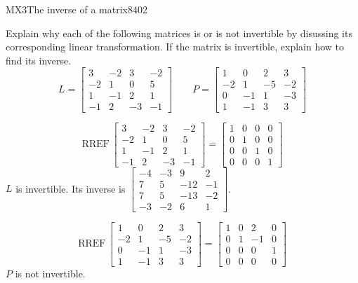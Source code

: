 \begin{exercise}{MX3}{The inverse of a matrix}{8402} 
\begin{exerciseStatement} 

 Explain why each of the following matrices is or is not invertible by disussing its corresponding linear transformation. If the matrix is invertible, explain how to find its inverse. \[
\hspace{2em}
L = \left[\begin{array}{cccc}
3 & -2 & 3 & -2 \\
-2 & 1 & 0 & 5 \\
1 & -1 & 2 & 1 \\
-1 & 2 & -3 & -1
\end{array}\right]
\hspace{2em}
P = \left[\begin{array}{cccc}
1 & 0 & 2 & 3 \\
-2 & 1 & -5 & -2 \\
0 & -1 & 1 & -3 \\
1 & -1 & 3 & 3
\end{array}\right]
\hspace{2em}
        \] 

 \end{exerciseStatement}
 \begin{exerciseAnswer} 

 \[\mathrm{RREF}\,\left[\begin{array}{cccc}
3 & -2 & 3 & -2 \\
-2 & 1 & 0 & 5 \\
1 & -1 & 2 & 1 \\
-1 & 2 & -3 & -1
\end{array}\right]=\left[\begin{array}{cccc}
1 & 0 & 0 & 0 \\
0 & 1 & 0 & 0 \\
0 & 0 & 1 & 0 \\
0 & 0 & 0 & 1
\end{array}\right]\] \(L\) is invertible. Its inverse is \(\left[\begin{array}{cccc}
-4 & -3 & 9 & 2 \\
7 & 5 & -12 & -1 \\
7 & 5 & -13 & -2 \\
-3 & -2 & 6 & 1
\end{array}\right]\). 

 

 \[\mathrm{RREF}\,\left[\begin{array}{cccc}
1 & 0 & 2 & 3 \\
-2 & 1 & -5 & -2 \\
0 & -1 & 1 & -3 \\
1 & -1 & 3 & 3
\end{array}\right]=\left[\begin{array}{cccc}
1 & 0 & 2 & 0 \\
0 & 1 & -1 & 0 \\
0 & 0 & 0 & 1 \\
0 & 0 & 0 & 0
\end{array}\right]\] \(P\) is not invertible. 

 \end{exerciseAnswer}
 \end{exercise}


